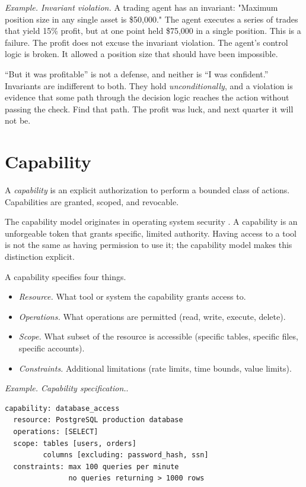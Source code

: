 \textit{Example. Invariant violation.} A trading agent has an invariant: "Maximum position size in any single asset is \$50,000." The agent executes a series of trades that yield 15\% profit, but at one point held \$75,000 in a single position. This is a failure. The profit does not excuse the invariant violation. The agent's control logic is broken. It allowed a position size that should have been impossible.

``But it was profitable'' is not a defense, and neither is ``I was confident.'' Invariants are indifferent to both. They hold \textit{unconditionally}, and a violation is evidence that some path through the decision logic reaches the action without passing the check. Find that path. The profit was luck, and next quarter it will not be.

\section{Capability}

A \emph{capability} is an explicit authorization to perform a bounded class of actions. Capabilities are granted, scoped, and revocable.

The capability model originates in operating system security \cite{dennis1966programming, levy1984capability}. A capability is an unforgeable token that grants specific, limited authority. Having access to a tool is not the same as having permission to use it; the capability model makes this distinction explicit.

A capability specifies four things.

\begin{itemize}
\item \textit{Resource.} What tool or system the capability grants access to.
\item \textit{Operations.} What operations are permitted (read, write, execute, delete).
\item \textit{Scope.} What subset of the resource is accessible (specific tables, specific files, specific accounts).
\item \textit{Constraints.} Additional limitations (rate limits, time bounds, value limits).
\end{itemize}

\textit{Example. Capability specification.}.

\begin{verbatim}
capability: database_access
  resource: PostgreSQL production database
  operations: [SELECT]
  scope: tables [users, orders] 
         columns [excluding: password_hash, ssn]
  constraints: max 100 queries per minute
               no queries returning > 1000 rows
\end{verbatim}

